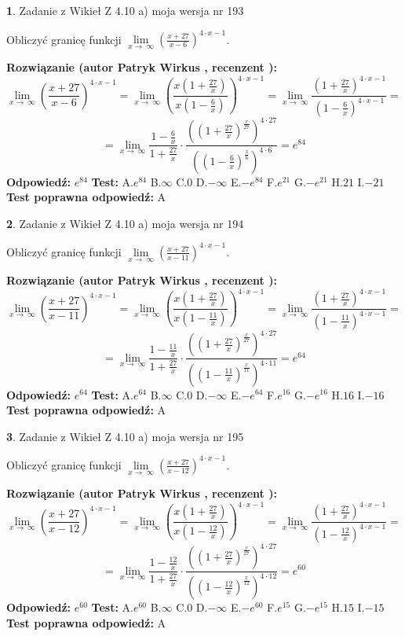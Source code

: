 \documentclass[12pt, a4paper]{article}
\theoremstyle{definition} %
\newtheorem{zad}{}
\newcommand{\zadStart}[1]{\begin{zad}#1\newline}
\newcommand{\zadStop}{\end{zad}}
\newcommand{\rozwStart}[2]{\noindent \textbf{Rozwiązanie (autor #1 , recenzent #2): }\newline}
\newcommand{\rozwStop}{\newline}
\newcommand{\odpStart}{\noindent \textbf{Odpowiedź:}\newline}
\newcommand{\odpStop}{\newline}
\newcommand{\testStart}{\noindent \textbf{Test:}\newline}
\newcommand{\testStop}{\newline}
\newcommand{\kluczStart}{\noindent \textbf{Test poprawna odpowiedź:}\newline}
\newcommand{\kluczStop}{\newline}
\begin{document}
\zadStart{Zadanie z Wikieł Z 4.10 a) moja wersja nr 193}

Obliczyć granicę funkcji  $\lim\limits_{x\to\ \infty}(\frac{x+27}{x-6})^{4\cdot x-1}$.
\zadStop
\rozwStart{Patryk Wirkus}{}
$$\lim\limits_{x\to\ \infty}(\frac{x+27}{x-6})^{4\cdot x-1} = \lim\limits_{x\to\ \infty}(\frac{x(1+\frac{27}{x})}{x(1-\frac{6}{x})})^{4\cdot x-1}=\lim\limits_{x\to\ \infty}\frac{(1+\frac{27}{x})^{4\cdot x-1}}{(1-\frac{6}{x})^{4\cdot x-1}}=$$
$$=\lim\limits_{x\to\ \infty}\frac{1-\frac{6}{x}}{1+\frac{27}{x}}\cdot\frac{((1+\frac{27}{x})^{\frac{x}{27}})^{4\cdot27}}{((1-\frac{6}{x})^{\frac{x}{6}})^{4\cdot6}}=e^{84}$$
\rozwStop
\odpStart
$e^{84}$
\odpStop
\testStart
A.$e^{84}$ B.$\infty$ C.$0$ D.$-\infty$ E.$-e^{84}$
F.$e^{21}$ G.$-e^{21}$
H.$21$
I.$-21$
\testStop
\kluczStart
A
\kluczStop



\zadStart{Zadanie z Wikieł Z 4.10 a) moja wersja nr 194}

Obliczyć granicę funkcji  $\lim\limits_{x\to\ \infty}(\frac{x+27}{x-11})^{4\cdot x-1}$.
\zadStop
\rozwStart{Patryk Wirkus}{}
$$\lim\limits_{x\to\ \infty}(\frac{x+27}{x-11})^{4\cdot x-1} = \lim\limits_{x\to\ \infty}(\frac{x(1+\frac{27}{x})}{x(1-\frac{11}{x})})^{4\cdot x-1}=\lim\limits_{x\to\ \infty}\frac{(1+\frac{27}{x})^{4\cdot x-1}}{(1-\frac{11}{x})^{4\cdot x-1}}=$$
$$=\lim\limits_{x\to\ \infty}\frac{1-\frac{11}{x}}{1+\frac{27}{x}}\cdot\frac{((1+\frac{27}{x})^{\frac{x}{27}})^{4\cdot27}}{((1-\frac{11}{x})^{\frac{x}{11}})^{4\cdot11}}=e^{64}$$
\rozwStop
\odpStart
$e^{64}$
\odpStop
\testStart
A.$e^{64}$ B.$\infty$ C.$0$ D.$-\infty$ E.$-e^{64}$
F.$e^{16}$ G.$-e^{16}$
H.$16$
I.$-16$
\testStop
\kluczStart
A
\kluczStop



\zadStart{Zadanie z Wikieł Z 4.10 a) moja wersja nr 195}

Obliczyć granicę funkcji  $\lim\limits_{x\to\ \infty}(\frac{x+27}{x-12})^{4\cdot x-1}$.
\zadStop
\rozwStart{Patryk Wirkus}{}
$$\lim\limits_{x\to\ \infty}(\frac{x+27}{x-12})^{4\cdot x-1} = \lim\limits_{x\to\ \infty}(\frac{x(1+\frac{27}{x})}{x(1-\frac{12}{x})})^{4\cdot x-1}=\lim\limits_{x\to\ \infty}\frac{(1+\frac{27}{x})^{4\cdot x-1}}{(1-\frac{12}{x})^{4\cdot x-1}}=$$
$$=\lim\limits_{x\to\ \infty}\frac{1-\frac{12}{x}}{1+\frac{27}{x}}\cdot\frac{((1+\frac{27}{x})^{\frac{x}{27}})^{4\cdot27}}{((1-\frac{12}{x})^{\frac{x}{12}})^{4\cdot12}}=e^{60}$$
\rozwStop
\odpStart
$e^{60}$
\odpStop
\testStart
A.$e^{60}$ B.$\infty$ C.$0$ D.$-\infty$ E.$-e^{60}$
F.$e^{15}$ G.$-e^{15}$
H.$15$
I.$-15$
\testStop
\kluczStart
A
\kluczStop
\end{document}
